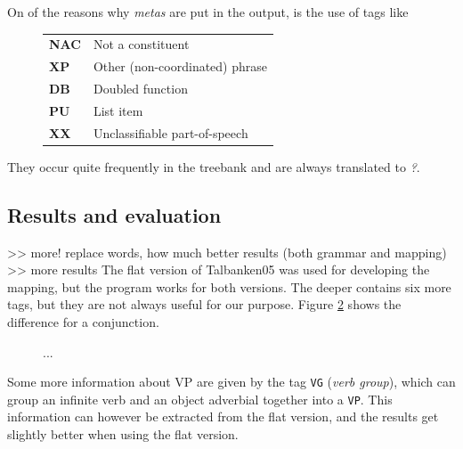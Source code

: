 \documentclass{report}
\begin{document}
On of the reasons why \textit{metas} are put in the output, is the 
use of tags like \\
\begin{figure}[h]
\begin{tabular}{ll}
\textbf{NAC} & Not a constituent\\
\textbf{XP} & Other (non-coordinated) phrase\\
\textbf{DB} & Doubled function\\
\textbf{PU} & List item\\
\textbf{XX} & Unclassifiable part-of-speech\\
\end{tabular}\label{fig:mapBadtag}
\end{figure}

They occur quite frequently in the treebank and are always translated
to \emph{?}.

\subsection{Results and evaluation}
>> more! replace words, how much better results (both grammar and mapping) 
>> more results
The flat version of Talbanken05 was used for developing the mapping, but
the program works for both versions.
The deeper contains six more tags, but they are not always useful for our       
purpose. Figure \ref{fig:mappDeepFlat} shows the difference for a conjunction.
\begin{figure}[h]
\centering
{}
\caption{...}
\label{fig:mappDeepFlat}
\end{figure}

Some more information about VP are given by the tag \verb|VG| (\emph{verb group}),
which can group an infinite verb and an object adverbial together into a \verb|VP|.
This information can however be extracted from the flat version, and the results
get slightly better when using the flat version. \\
\end{document}
